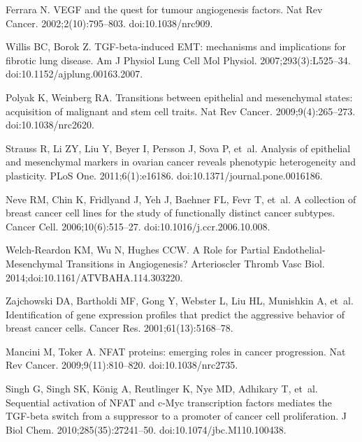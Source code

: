 \documentclass[11pt,letterpaper]{article}
\begin{document}
\begin{thebibliography}{10}
Ferrara N.
\newblock VEGF and the quest for tumour angiogenesis factors.
\newblock Nat Rev Cancer. 2002;2(10):795--803.
\newblock doi:{10.1038/nrc909}.

Willis BC, Borok Z.
\newblock TGF-beta-induced EMT: mechanisms and implications for fibrotic lung
  disease.
\newblock Am J Physiol Lung Cell Mol Physiol. 2007;293(3):L525--34.
\newblock doi:{10.1152/ajplung.00163.2007}.

Polyak K, Weinberg RA.
\newblock Transitions between epithelial and mesenchymal states: acquisition of
  malignant and stem cell traits.
\newblock Nat Rev Cancer. 2009;9(4):265--273.
\newblock doi:{10.1038/nrc2620}.

Strauss R, Li ZY, Liu Y, Beyer I, Persson J, Sova P, et~al.
\newblock Analysis of epithelial and mesenchymal markers in ovarian cancer
  reveals phenotypic heterogeneity and plasticity.
\newblock PLoS One. 2011;6(1):e16186.
\newblock doi:{10.1371/journal.pone.0016186}.

Neve RM, Chin K, Fridlyand J, Yeh J, Baehner FL, Fevr T, et~al.
\newblock A collection of breast cancer cell lines for the study of
  functionally distinct cancer subtypes.
\newblock Cancer Cell. 2006;10(6):515--27.
\newblock doi:{10.1016/j.ccr.2006.10.008}.

Welch-Reardon KM, Wu N, Hughes CCW.
\newblock A Role for Partial Endothelial-Mesenchymal Transitions in
  Angiogenesis?
\newblock Arterioscler Thromb Vasc Biol. 2014;doi:{10.1161/ATVBAHA.114.303220}.

Zajchowski DA, Bartholdi MF, Gong Y, Webster L, Liu HL, Munishkin A, et~al.
\newblock Identification of gene expression profiles that predict the
  aggressive behavior of breast cancer cells.
\newblock Cancer Res. 2001;61(13):5168--78.

Mancini M, Toker A.
\newblock NFAT proteins: emerging roles in cancer progression.
\newblock Nat Rev Cancer. 2009;9(11):810--820.
\newblock doi:{10.1038/nrc2735}.

Singh G, Singh SK, K{\"o}nig A, Reutlinger K, Nye MD, Adhikary T, et~al.
\newblock Sequential activation of NFAT and c-Myc transcription factors
  mediates the TGF-beta switch from a suppressor to a promoter of cancer cell
  proliferation.
\newblock J Biol Chem. 2010;285(35):27241--50.
\newblock doi:{10.1074/jbc.M110.100438}.


\end{thebibliography}
\end{document}
